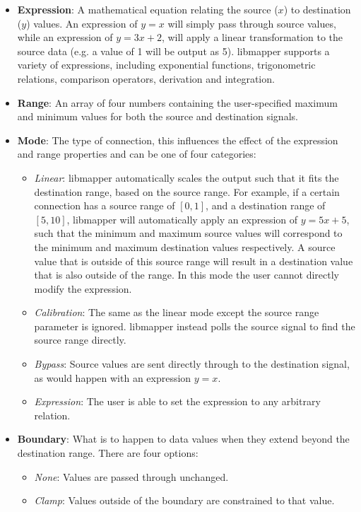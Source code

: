 \begin{itemize}
	\item\textbf{Expression}: A mathematical equation relating the source ($x$) to destination ($y$) values. An expression of $y = x$ will simply pass through source values, while an expression of $y = 3x + 2$, will apply a linear transformation to the source data (e.g. a value of 1 will be output as 5). libmapper supports a variety of expressions, including exponential functions, trigonometric relations, comparison operators, derivation and integration. 
	\item\textbf{Range}: An array of four numbers containing the user-specified maximum and minimum values for both the source and destination signals.
	\item\textbf{Mode}: The type of connection, this influences the effect of the expression and range properties and can be one of four categories:
	\begin{itemize}
		\item \emph{Linear}: libmapper automatically scales the output such that it fits the destination range, based on the source range. For example, if a certain connection has a source range of $[0, 1]$, and a destination range of $[5, 10]$, libmapper will automatically apply an expression of $y = 5x + 5$, such that the minimum and maximum source values will correspond to the minimum and maximum destination values respectively. A source value that is outside of this source range will result in a destination value that is also outside of the range. In this mode the user cannot directly modify the expression. 
		\item \emph{Calibration}: The same as the linear mode except the source range parameter is ignored. libmapper instead polls the source signal to find the source range directly.
		\item \emph{Bypass}: Source values are sent directly through to the destination signal, as would happen with an expression $y = x$.
		\item \emph{Expression}: The user is able to set the expression to any arbitrary relation.
	\end{itemize}
	\item\textbf{Boundary}: What is to happen to data values when they extend beyond the destination range. There are four options:
	\begin{itemize}
		\item\emph{None}: Values are passed through unchanged.
		\item\emph{Clamp}: Values outside of the boundary are constrained to that value.

\end{itemize}
\end{itemize}
